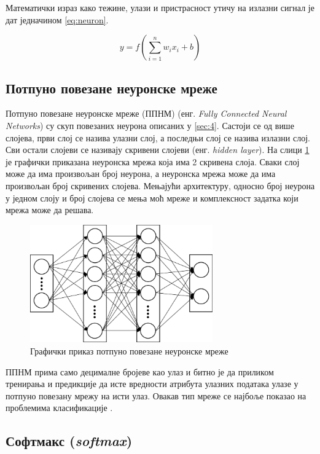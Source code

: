 Математички израз како тежине, улази и пристрасност утичу на излазни сигнал је дат једначином \ref{eq:neuron}.

\begin{equation}
    y = f\left(\sum_{i=1}^{n} w_i x_i + b\right)
    \label{eq:neuron}
\end{equation}

\subsection{Потпуно повезане неуронске мреже}
\label{sec:41}

Потпуно повезане неуронске мреже (ППНМ) (енг. \textit{Fully Connected Neural Networks}) су скуп повезаних неурона описаних у \ref{sec:4}. 
Састоји се од више слојева, први слој се назива улазни слој, а последњи слој се назива излазни слој. 
Сви остали слојеви се називају скривени слојеви (енг. \textit{hidden layer}). 
На слици \ref{fig:fc} је графички приказана неуронска мрежа која има 2 скривена слоја.
Сваки слој може да има произвољан број неурона, а неуронска мрежа може да има произвољан број скривених слојева. 
Мењајући архитектуру, односно број неурона у једном слоју и број слојева се мења моћ мреже и комплексност задатка који мрежа може да решава.

\begin{figure}[!h]
    \centering
    \includegraphics[width=0.7\textwidth]{images/fc.png}
    \caption{Графички приказ потпуно повезане неуронске мреже \cite{anwar_learned_2017}}
    \label{fig:fc}
\end{figure}

ППНМ прима само децималне бројеве као улаз и битно је да приликом тренирања и предикције да исте вредности атрибута улазних података улазе у потпуно повезану мрежу на исти улаз.
Овакав тип мреже се најбоље показао на проблемима класификације \cite{noauthor_artificial_2023}.

\subsection{Софтмакс (\textit{softmax})}

